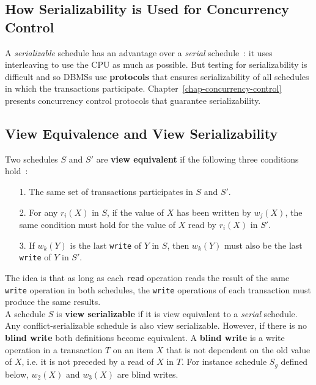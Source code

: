 \subsection{How Serializability is Used for Concurrency Control}
A \textit{serializable} schedule has an advantage over a \textit{serial} schedule~: it uses interleaving to use the CPU as much as possible. But testing for serializability is difficult and so DBMSs use \textbf{protocols} that ensures serializability of all schedules in which the transactions participate. Chapter~\ref{chap-concurrency-control} presents concurrency control protocols that guarantee serializability.


\subsection{View Equivalence and View Serializability}
Two schedules $S$ and $S'$ are \textbf{view equivalent} if the following three conditions hold~:

\begin{itemize}
    \item[1.] The same set of transactions participates in $S$ and $S'$.
    \item[2.] For any $r_i(X)$ in $S$, if the value of $X$ has been written by $w_j(X)$, the same condition must hold for the value of $X$ read by $r_i(X)$ in $S'$.
    \item[3.] If $w_k(Y)$ is the last \texttt{write} of $Y$ in $S$, then $w_k(Y)$ must also be the last \texttt{write} of $Y$ in $S'$.
\end{itemize}

The idea is that as long as each \texttt{read} operation reads the result of the same \texttt{write} operation in both schedules, the \texttt{write} operations of each transaction must produce the same results. \\

A schedule $S$ is \textbf{view serializable} if it is view equivalent to a \textit{serial} schedule. \\

Any conflict-serializable schedule is also view serializable. However, if there is no \textbf{blind write} both definitions become equivalent. A \textbf{blind write} is a write operation in a transaction $T$ on an item $X$ that is not dependent on the old value of $X$, i.e. it is not preceded by a read of $X$ in $T$. For instance schedule $S_g$ defined below, $w_2(X)$ and $w_3(X)$ are blind writes.


